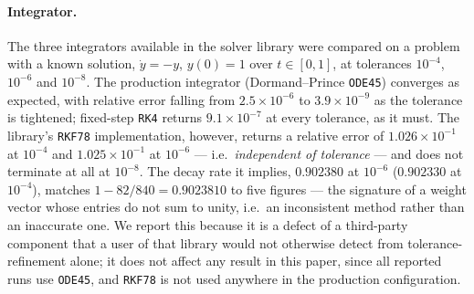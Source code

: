 \documentclass[a4paper,fleqn]{cas-sc}
\begin{document}
\paragraph{Integrator.}
The three integrators available in the solver library were compared on a
problem with a known solution, $\dot y = -y$, $y(0)=1$ over $t\in[0,1]$, at
tolerances $10^{-4}$, $10^{-6}$ and $10^{-8}$. The production integrator
(Dormand--Prince \texttt{ODE45}) converges as expected, with relative error
falling from $2.5\times10^{-6}$ to $3.9\times10^{-9}$ as the tolerance is
tightened; fixed-step \texttt{RK4} returns $9.1\times10^{-7}$ at every
tolerance, as it must. The library's \texttt{RKF78} implementation, however,
returns a relative error of $1.026\times10^{-1}$ at $10^{-4}$ and
$1.025\times10^{-1}$ at $10^{-6}$ --- i.e.\ \emph{independent of tolerance} ---
and does not terminate at all at $10^{-8}$. The decay rate it implies,
$0.902380$ at $10^{-6}$ ($0.902330$ at $10^{-4}$), matches
$1 - 82/840 = 0.9023810$ to five figures --- the signature of a weight vector
whose entries do not sum to unity, i.e.\ an inconsistent method rather than an
inaccurate one. We report this because it is a defect of a third-party
component that a user of that library would not otherwise detect from
tolerance-refinement alone; it does not affect any result in this paper, since
all reported runs use \texttt{ODE45}, and \texttt{RKF78} is not used anywhere
in the production configuration.
\end{document}

